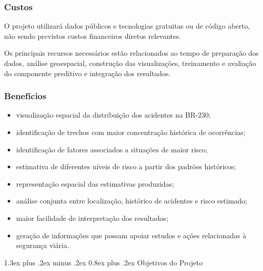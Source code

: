 \documentclass[11pt,a4paper]{article}
\makeatletter
\renewcommand\section{
\@startsection{section}{1}{0pt}%
{1.3ex plus .2ex minus .2ex}%
{0.8ex plus .2ex}%
{\normalfont\Large\bfseries}
}
\makeatother
\begin{document}
\subsubsection*{Custos}

O projeto utilizará dados públicos e tecnologias gratuitas ou de código aberto, não sendo previstos custos financeiros diretos relevantes.

Os principais recursos necessários estão relacionados ao tempo de preparação dos dados, análise geoespacial, construção das visualizações, treinamento e avaliação do componente preditivo e integração dos resultados.

\subsubsection*{Benefícios}

\begin{itemize}

    \item visualização espacial da distribuição dos acidentes na BR-230;

    \item identificação de trechos com maior concentração histórica de ocorrências;

    \item identificação de fatores associados a situações de maior risco;

    \item estimativa de diferentes níveis de risco a partir dos padrões históricos;

    \item representação espacial das estimativas produzidas;

    \item análise conjunta entre localização, histórico de acidentes e risco estimado;

    \item maior facilidade de interpretação dos resultados;

    \item geração de informações que possam apoiar estudos e ações relacionadas à segurança viária.

\end{itemize}



\section{Objetivos do Projeto}
\end{document}
